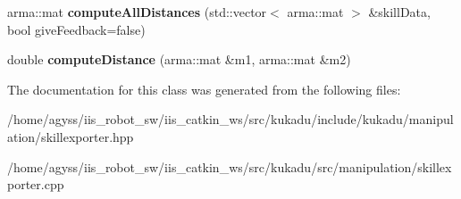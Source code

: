 \begin{DoxyCompactItemize}
\item 
arma\+::mat {\bfseries compute\+All\+Distances} (std\+::vector$<$ arma\+::mat $>$ \&skill\+Data, bool give\+Feedback=false)\hypertarget{classkukadu_1_1SkillExporter_a342553f038be7360cb60dbd3c2534223}{}\label{classkukadu_1_1SkillExporter_a342553f038be7360cb60dbd3c2534223}

\item 
double {\bfseries compute\+Distance} (arma\+::mat \&m1, arma\+::mat \&m2)\hypertarget{classkukadu_1_1SkillExporter_a6d1159757fb38d8d69762eddcf2250cb}{}\label{classkukadu_1_1SkillExporter_a6d1159757fb38d8d69762eddcf2250cb}

\end{DoxyCompactItemize}


The documentation for this class was generated from the following files\+:\begin{DoxyCompactItemize}
\item 
/home/agyss/iis\+\_\+robot\+\_\+sw/iis\+\_\+catkin\+\_\+ws/src/kukadu/include/kukadu/manipulation/skillexporter.\+hpp\item 
/home/agyss/iis\+\_\+robot\+\_\+sw/iis\+\_\+catkin\+\_\+ws/src/kukadu/src/manipulation/skillexporter.\+cpp\end{DoxyCompactItemize}
